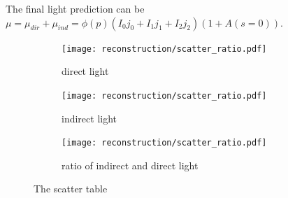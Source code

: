 The final light prediction can be $\mu=\mu_{dir}+\mu_{ind}=\phi(p)(I_0j_0+I_1j_1+I_2j_2)(1+A(s=0))$.
\begin{figure}[htbp]
	\centering
	\begin{subfigure}{0.5\textwidth}
		\centering
		\texttt{[image: reconstruction/scatter\_ratio.pdf]}
		\caption{direct light}
		\label{fig:dir}
	\end{subfigure}%
	\hfill
	\begin{subfigure}{0.5\textwidth}
		\centering
		\texttt{[image: reconstruction/scatter\_ratio.pdf]}
		\caption{indirect light}
		\label{fig:ind}
	\end{subfigure}%
	\hfill
	\begin{subfigure}{0.5\textwidth}
		\centering
		\texttt{[image: reconstruction/scatter\_ratio.pdf]}
		\caption{ratio of indirect and direct light}
		\label{fig:ratio}
	\end{subfigure}
	\caption{The scatter table}
	\label{fig:scatterTable}
\end{figure}

